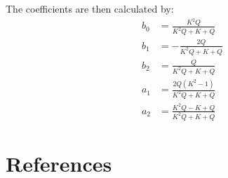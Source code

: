 \documentclass[11pt]{article}
\begin{document}
The coefficients are then calculated by:
\begin{align}
    b_0 &= \frac{K^2Q}{K^2Q + K + Q}\\
    b_1 &= - \frac{2Q}{K^2Q + K + Q}\\
    b_2 &= \frac{Q}{K^2Q + K + Q}\\
    a_1 &= \frac{2Q(K^2 - 1)}{K^2Q + K + Q}\\
    a_2 &= \frac{K^2Q - K + Q}{K^2Q + K + Q}
\end{align}
\cite{Zolzer:2011}

\section{References}
{}


\printindex
\end{document}
